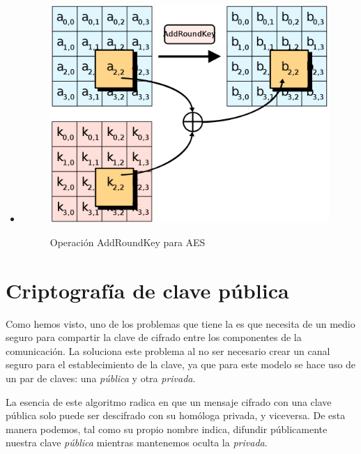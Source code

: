 \begin{itemize}
 \item {}

 \begin{figure}[ht]
   \centering
   \includegraphics[scale=0.3]{Figures/AddRoundKey}
   \decoRule
   \caption[AddRoundKey (AES)]{Operación AddRoundKey para AES} \emph{\parencite{Reference30}}
   \label{fig:AddRoundKey}
 \end{figure}

 \end{itemize}


 \section{Criptografía de clave pública}

 Como hemos visto, uno de los problemas que tiene la  es que necesita de un medio seguro para compartir la clave de cifrado entre los componentes de la comunicación.
 La  soluciona este problema al no ser necesario crear un canal seguro para el establecimiento de la clave, ya que para este modelo se hace uso de un par de claves: una \emph{pública} y otra \emph{privada}.

 La esencia de este algoritmo radica en que un mensaje cifrado con una clave pública solo puede ser descifrado con su homóloga privada, y viceversa.
 De esta manera podemos, tal como su propio nombre indica, difundir públicamente nuestra clave \emph{pública} mientras mantenemos oculta la \emph{privada}.

